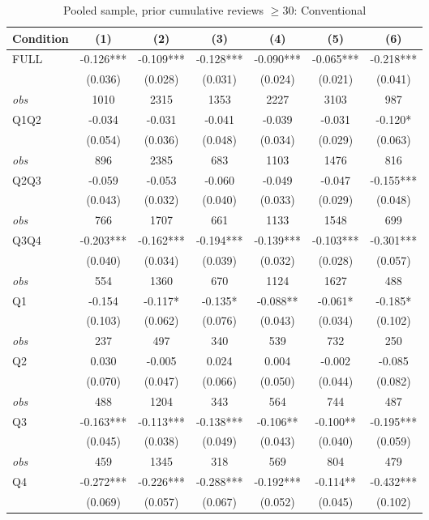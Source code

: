 \begin{table}[!htbp]
\centering
\caption{Pooled sample, prior cumulative reviews $\geq30$: Conventional}
\begin{tabular}{lcccccc}
\toprule
Condition & (1) & (2) & (3) & (4) & (5) & (6) \\
\midrule
FULL & -0.126*** & -0.109*** & -0.128*** & -0.090*** & -0.065*** & -0.218*** \\
 & (0.036) & (0.028) & (0.031) & (0.024) & (0.021) & (0.041) \\
\textit{obs} & 1010 & 2315 & 1353 & 2227 & 3103 & 987 \\
Q1Q2 & -0.034 & -0.031 & -0.041 & -0.039 & -0.031 & -0.120* \\
 & (0.054) & (0.036) & (0.048) & (0.034) & (0.029) & (0.063) \\
\textit{obs} & 896 & 2385 & 683 & 1103 & 1476 & 816 \\
Q2Q3 & -0.059 & -0.053 & -0.060 & -0.049 & -0.047 & -0.155*** \\
 & (0.043) & (0.032) & (0.040) & (0.033) & (0.029) & (0.048) \\
\textit{obs} & 766 & 1707 & 661 & 1133 & 1548 & 699 \\
Q3Q4 & -0.203*** & -0.162*** & -0.194*** & -0.139*** & -0.103*** & -0.301*** \\
 & (0.040) & (0.034) & (0.039) & (0.032) & (0.028) & (0.057) \\
\textit{obs} & 554 & 1360 & 670 & 1124 & 1627 & 488 \\
Q1 & -0.154 & -0.117* & -0.135* & -0.088** & -0.061* & -0.185* \\
 & (0.103) & (0.062) & (0.076) & (0.043) & (0.034) & (0.102) \\
\textit{obs} & 237 & 497 & 340 & 539 & 732 & 250 \\
Q2 & 0.030 & -0.005 & 0.024 & 0.004 & -0.002 & -0.085 \\
 & (0.070) & (0.047) & (0.066) & (0.050) & (0.044) & (0.082) \\
\textit{obs} & 488 & 1204 & 343 & 564 & 744 & 487 \\
Q3 & -0.163*** & -0.113*** & -0.138*** & -0.106** & -0.100** & -0.195*** \\
 & (0.045) & (0.038) & (0.049) & (0.043) & (0.040) & (0.059) \\
\textit{obs} & 459 & 1345 & 318 & 569 & 804 & 479 \\
Q4 & -0.272*** & -0.226*** & -0.288*** & -0.192*** & -0.114** & -0.432*** \\
 & (0.069) & (0.057) & (0.067) & (0.052) & (0.045) & (0.102) \\

\end{tabular}
\end{table}
